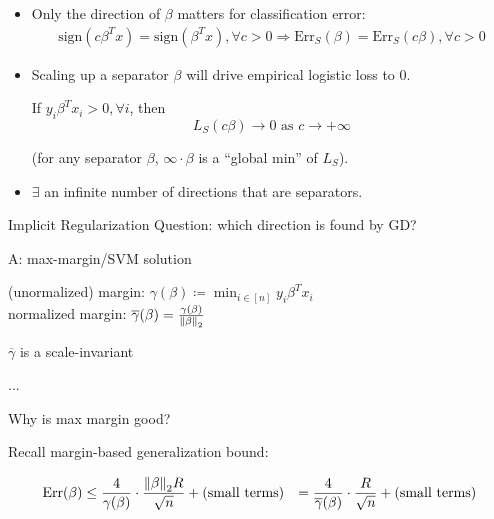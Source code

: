 \begin{itemize}
    \item Only the direction of \(\beta\) matters for classification error: 
    \begin{align*}
     \text{sign} \left(  c \beta^T x \right) = \text{sign} \left(\beta^T x\right), \forall c > 0 
     \Rightarrow \text{Err}_S (\beta) = \text{Err}_S (c \beta), \forall c > 0 
    \end{align*}

    \item Scaling up a separator \(\beta\) will drive empirical logistic loss to 0. 
    
    If \(y_i \beta^T x_i > 0, \forall i\), then 
    \[
        L_S (c \beta) \to 0 \text{ as } c \to + \infty   
    \]

    (for any separator \(\beta\), \(\infty \cdot \beta\) is a ``global min'' of \(L_S\)). 

    \item \(\exists\) an infinite number of directions that are separators. 
\end{itemize}

Implicit Regularization Question: which direction is found by GD? 

A: max-margin/SVM solution 


\begin{definition}
    (unormalized) margin: \(\gamma (\beta) \coloneqq \min_{i \in [n]} y_i \beta^T x_i\)  \\ 
    normalized margin: \(\overline{\gamma}(\beta) = \frac{\gamma (\beta)}{\norm{\beta}_2}\) 
\end{definition}

\begin{remark}
    \(\overline{\gamma}\) is a scale-invariant 
\end{remark}

\begin{definition}
    ... 
\end{definition}

\begin{remark}
    Why is max margin good? 

    Recall margin-based generalization bound: 

    \begin{align*}
        \text{Err} (\beta) &\leq \frac{4}{\gamma (\beta)} \cdot \frac{\norm{\beta}_2 R}{\sqrt{n}}
        + (\text{small terms}) 
        &= \frac{4}{\overline{\gamma}(\beta)} \cdot \frac{R}{\sqrt{n}} + (\text{small terms})
    \end{align*}

\end{remark}

